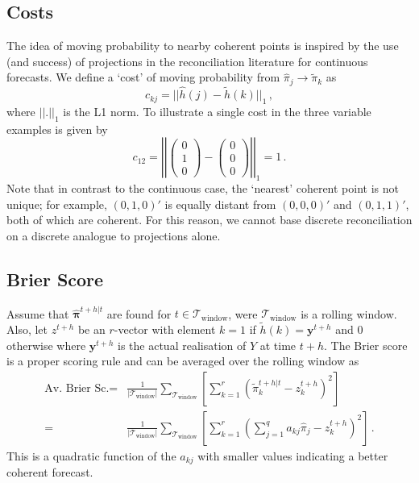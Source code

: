 \documentclass[a4paper,review,12pt,authoryear]{elsarticle}
\newcommand{\bpi}{\bm{\pi}}
\begin{document}
      \subsection{Costs}
      
      The idea of moving probability to nearby coherent points is inspired by the use (and success) of projections in the reconciliation literature for continuous forecasts. We define a `cost' of moving probability from $\hat{\pi}_j\rightarrow\tilde{\pi}_k$ as
      \[
      c_{kj}=||\hat{h}(j)-\tilde{h}(k)||_1\,,
      \]
      where $||.||_1$ is the L1 norm. To illustrate a single cost in the three variable examples is given by
      \[
      c_{12}=\left|\left|\begin{pmatrix}0\\1\\0\end{pmatrix}-\begin{pmatrix}0\\0\\0\end{pmatrix}\right|\right|_1=1\,.
      \]
      Note that in contrast to the continuous case, the `nearest' coherent point is not unique; for example, $(0,1,0)'$ is equally distant from $(0,0,0)'$ and $(0,1,1)'$, both of which are coherent. For this reason, we cannot base discrete reconciliation on a discrete analogue to projections alone.
      
      \subsection{Brier Score}
      
      Assume that $\hat{\bpi}^{t+h|t}$ are found for $t\in\mathcal{T}_{\textrm{window}}$, were $\mathcal{T}_{\textrm{window}}$ is a rolling window. Also, let $z^{t+h}$ be an $r$-vector with element $k=1$ if $\tilde{h}(k)=\bm{y}^{t+h}$ and $0$ otherwise where $\bm{y}^{t+h}$ is the actual realisation of $Y$ at time $t+h$. The Brier score is a proper scoring rule and can be averaged over the rolling window as
      \begin{align*}
      \textrm{Av. Brier Sc.}=&\frac{1}{|\mathcal{T}_{\textrm{window}}|}\sum\limits_{\mathcal{T}_{\textrm{window}}}\left[\sum\limits_{k=1}^r\left(\tilde{\pi}_k^{t+h|t}-z^{t+h}_k\right)^2\right]\\
      =&\frac{1}{|\mathcal{T}_{\textrm{window}}|}\sum\limits_{\mathcal{T}_{\textrm{window}}}\left[\sum\limits_{k=1}^r\left(\sum\limits_{j=1}^q a_{kj}\hat{{\pi}}_j-z^{t+h}_k\right)^2\right]\,.
      \end{align*}
      This is a quadratic function of the $a_{kj}$ with smaller values indicating a better coherent forecast.
      
\end{document}
